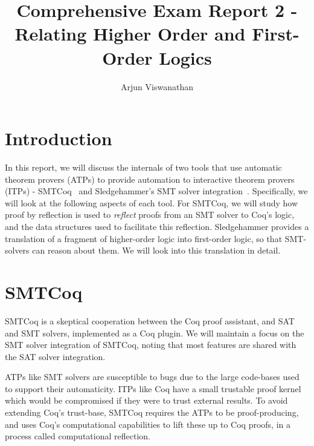 \documentclass{article}
\begin{document}
\title{Comprehensive Exam Report 2 - Relating Higher Order and First-Order Logics}
\author{Arjun Viswanathan}
\date{}
\maketitle

\section{Introduction}
\label{sec:intro}
	In this report, we will discuss the 
	internals of two tools that use 
	automatic theorem provers (ATPs) to 
	provide automation to interactive 
	theorem provers (ITPs) - 
	SMTCoq~\cite{DBLP:phd/hal/Keller13} 
	and Sledgehammer's SMT solver 
	integration~\cite{bohme}. Specifically, 
	we will look at the following aspects 
	of each tool. For SMTCoq, we will study 
	how proof by reflection is used to 
	\textit{reflect} proofs from an SMT 
	solver to Coq's logic, and the data 
	structures used to facilitate this 
	reflection.	Sledgehammer provides a 
	translation of a fragment of 
	higher-order logic into first-order 
	logic, so that SMT-solvers can reason 
	about them. We will look into this 
	translation in detail.

\section{SMTCoq}
\label{sec:smtcoq}
	SMTCoq is a skeptical cooperation 
	between the Coq proof assistant, and 
	SAT and SMT solvers, implemented as a 
	Coq plugin. We will maintain a focus 
	on the SMT solver integration of 
	SMTCoq, noting that most features are 
	shared with the SAT	solver integration.
	
	ATPs like SMT solvers are susceptible 
	to bugs due to the large code-bases 
	used to support	their automaticity. 
	ITPs like Coq have a small trustable 
	proof kernel which would be 
	compromised if they were to trust
	external results. To avoid extending 
	Coq's trust-base, SMTCoq requires the 
	ATPs to be proof-producing, and uses 
	Coq's computational capabilities 
	to lift these up to Coq proofs, in a 
	process called computational 
	reflection. 
	
\end{document}

